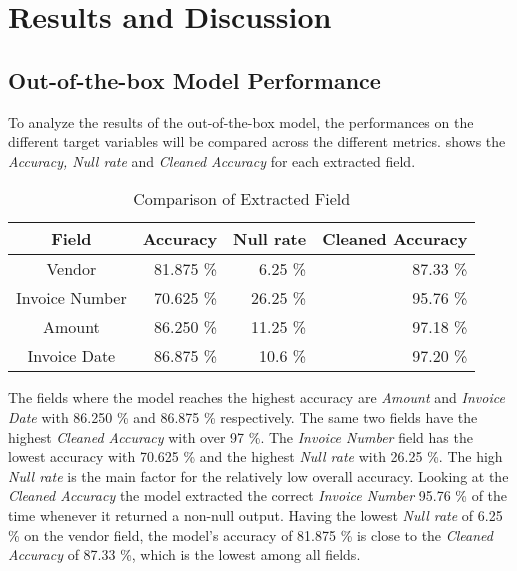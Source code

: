\chapter{Results and Discussion}

\section{Out-of-the-box Model Performance}

To analyze the results of the out-of-the-box model, the performances on the different target variables will be compared across the different metrics.  shows the \textit{Accuracy, Null rate} and \textit{Cleaned Accuracy} for each extracted field. 

\begin{table}[ht]   %
    \centering
    \footnotesize
    \begin{tabular}{c|rrr} %
        \toprule    %
        Field  & Accuracy  & Null rate & Cleaned Accuracy \\
        \midrule    %
        Vendor           & 81.875 \%   &  6.25 \%   & 87.33 \% \\
        Invoice Number   & 70.625 \%   & 26.25 \%  & 95.76 \%\\
        Amount           & 86.250 \%   & 11.25 \%  & 97.18 \% \\
        Invoice Date     & 86.875 \%   & 10.6  \%  & 97.20 \% \\
        \bottomrule %
    \end{tabular}
    \caption{Comparison of Extracted Field}
    \label{table:Field_Com}
\end{table}

The fields where the model reaches the highest accuracy are \textit{Amount} and \textit{Invoice Date} with 86.250 \% and 86.875 \% respectively. The same two fields have the highest \textit{Cleaned Accuracy} with over 97 \%. The \textit{Invoice Number} field has the lowest accuracy with 70.625 \% and the highest \textit{Null rate} with 26.25 \%. The high \textit{Null rate} is the main factor for the relatively low overall accuracy. Looking at the \textit{Cleaned Accuracy} the model extracted the correct \textit{Invoice Number} 95.76 \% of the time whenever it returned a non-null output. Having the lowest \textit{Null rate} of 6.25 \% on the vendor field, the model's accuracy of 81.875 \% is close to the \textit{Cleaned Accuracy} of 87.33 \%, which is the lowest among all fields. 

